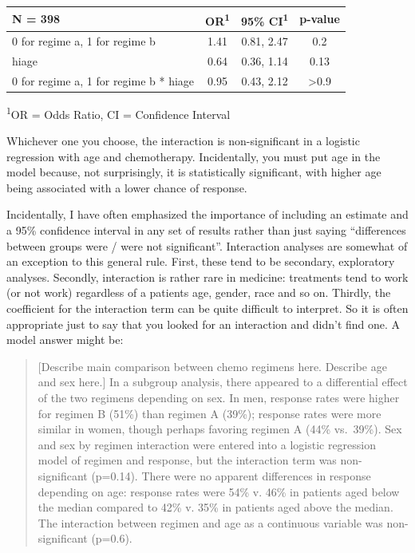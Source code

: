 \documentclass[]{book}
\begin{document}
\captionsetup[table]{labelformat=empty,skip=1pt}
\begin{longtable}{lccc}
\toprule
\textbf{N = 398} & \textbf{OR}\textsuperscript{1} & \textbf{95\% CI}\textsuperscript{1} & \textbf{p-value} \\ 
\midrule
0 for regime a, 1 for regime b & 1.41 & 0.81, 2.47 & 0.2 \\ 
hiage & 0.64 & 0.36, 1.14 & 0.13 \\ 
0 for regime a, 1 for regime b * hiage & 0.95 & 0.43, 2.12 & >0.9 \\ 
\bottomrule
\end{longtable}
\vspace{-5mm}
\begin{minipage}{\linewidth}
\textsuperscript{1}OR = Odds Ratio, CI = Confidence Interval \\ 
\end{minipage}

Whichever one you choose, the interaction is non-significant in a
logistic regression with age and chemotherapy. Incidentally, you must
put age in the model because, not surprisingly, it is statistically
significant, with higher age being associated with a lower chance of
response.

Incidentally, I have often emphasized the importance of including an
estimate and a 95\% confidence interval in any set of results rather
than just saying ``differences between groups were / were not
significant''. Interaction analyses are somewhat of an exception to this
general rule. First, these tend to be secondary, exploratory analyses.
Secondly, interaction is rather rare in medicine: treatments tend to
work (or not work) regardless of a patients age, gender, race and so on.
Thirdly, the coefficient for the interaction term can be quite difficult
to interpret. So it is often appropriate just to say that you looked for
an interaction and didn't find one. A model answer might be:

\begin{quote}
{[}Describe main comparison between chemo regimens here. Describe age
and sex here.{]} In a subgroup analysis, there appeared to a
differential effect of the two regimens depending on sex. In men,
response rates were higher for regimen B (51\%) than regimen A (39\%);
response rates were more similar in women, though perhaps favoring
regimen A (44\% vs.~39\%). Sex and sex by regimen interaction were
entered into a logistic regression model of regimen and response, but
the interaction term was non-significant (p=0.14). There were no
apparent differences in response depending on age: response rates were
54\% v. 46\% in patients aged below the median compared to 42\% v. 35\%
in patients aged above the median. The interaction between regimen and
age as a continuous variable was non-significant (p=0.6).
\end{quote}
\end{document}
